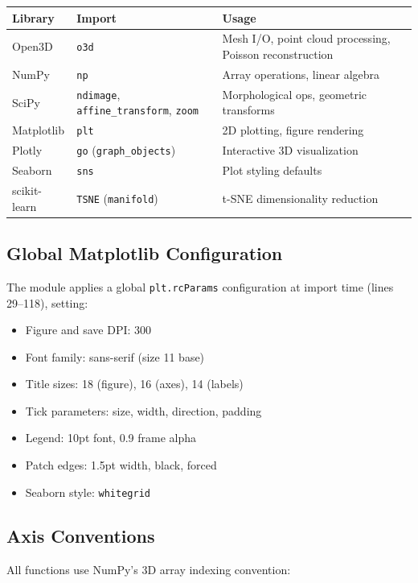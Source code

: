 \documentclass[12pt,a4paper]{article}
\begin{document}
\begin{table}[H]
\centering
\begin{tabular}{lll}
\toprule
\textbf{Library} & \textbf{Import} & \textbf{Usage} \\
\midrule
Open3D & \texttt{o3d} & Mesh I/O, point cloud processing, Poisson reconstruction \\
NumPy & \texttt{np} & Array operations, linear algebra \\
SciPy & \texttt{ndimage}, \texttt{affine\_transform}, \texttt{zoom} & Morphological ops, geometric transforms \\
Matplotlib & \texttt{plt} & 2D plotting, figure rendering \\
Plotly & \texttt{go} (\texttt{graph\_objects}) & Interactive 3D visualization \\
Seaborn & \texttt{sns} & Plot styling defaults \\
scikit-learn & \texttt{TSNE} (\texttt{manifold}) & t-SNE dimensionality reduction \\
\bottomrule
\end{tabular}
\end{table}

\subsection{Global Matplotlib Configuration}

The module applies a global \texttt{plt.rcParams} configuration at import time (lines 29--118), setting:

\begin{itemize}
  \item Figure and save DPI: 300
  \item Font family: sans-serif (size 11 base)
  \item Title sizes: 18 (figure), 16 (axes), 14 (labels)
  \item Tick parameters: size, width, direction, padding
  \item Legend: 10pt font, 0.9 frame alpha
  \item Patch edges: 1.5pt width, black, forced
  \item Seaborn style: \texttt{whitegrid}
\end{itemize}

\subsection{Axis Conventions}

All functions use NumPy's 3D array indexing convention:
\end{document}
